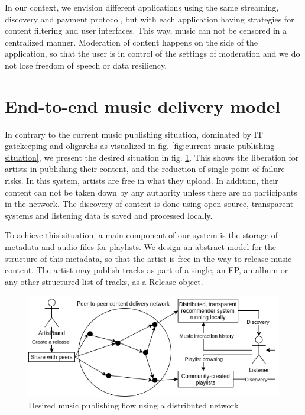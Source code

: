 In our context, we envision different applications using the same streaming, discovery and payment protocol, but with each application having strategies for content filtering and user interfaces. This way, music can not be censored in a centralized manner. Moderation of content happens on the side of the application, so that the user is in control of the settings of moderation and we do not lose freedom of speech or data resiliency.

\section{End-to-end music delivery model}
\label{sec:release-model}
In contrary to the current music publishing situation, dominated by IT gatekeeping and oligarchs as visualized in fig. \ref{fig:current-music-publishing-situation}, we present the desired situation in fig. \ref{fig:desired-music-publishing-situation}. This shows the liberation for artists in publishing their content, and the reduction of single-point-of-failure risks. In this system, artists are free in what they upload. In addition, their content can not be taken down by any authority unless there are no participants in the network. The discovery of content is done using open source, transparent systems and listening data is saved and processed locally.

To achieve this situation, a main component of our system is the storage of metadata and audio files for playlists. We design an abstract model for the structure of this metadata, so that the artist is free in the way to release music content. The artist may publish tracks as part of a single, an EP, an album or any other structured list of tracks, as a Release object.

\begin{figure}
    \centering
    \includegraphics[width=0.8\linewidth]{design/desired-music-publishing-situation.png}
    \caption{Desired music publishing flow using a distributed network}
    \label{fig:desired-music-publishing-situation}
\end{figure}

